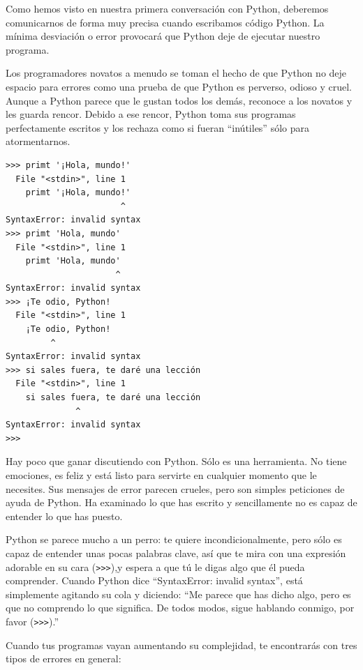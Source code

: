 Como hemos visto en nuestra primera conversación con Python, deberemos
comunicarnos de forma muy precisa cuando escribamos código Python. La mínima
desviación o error provocará que Python deje de ejecutar
nuestro programa.

Los programadores novatos a menudo se toman el hecho de que Python no
deje espacio para errores como una prueba de que Python es perverso, odioso y cruel.
Aunque a Python parece que le gustan todos los demás, reconoce a los novatos
y les guarda rencor. Debido a ese rencor,
Python toma sus programas perfectamente escritos y los rechaza como si fueran
``inútiles'' sólo para atormentarnos.

\beforeverb
\begin{verbatim}
>>> primt '¡Hola, mundo!'
  File "<stdin>", line 1
    primt '¡Hola, mundo!'
                       ^
SyntaxError: invalid syntax
>>> primt 'Hola, mundo'
  File "<stdin>", line 1
    primt 'Hola, mundo'
                      ^
SyntaxError: invalid syntax
>>> ¡Te odio, Python!
  File "<stdin>", line 1
    ¡Te odio, Python!
         ^
SyntaxError: invalid syntax
>>> si sales fuera, te daré una lección
  File "<stdin>", line 1
    si sales fuera, te daré una lección
              ^
SyntaxError: invalid syntax
>>> 
\end{verbatim}
\afterverb
%
Hay poco que ganar discutiendo con Python. Sólo es una herramienta.
No tiene emociones, es feliz y está listo para servirte en cualquier momento
que le necesites. Sus mensajes de error parecen crueles, pero son simples
peticiones de ayuda de Python. Ha examinado lo que has escrito y sencillamente
no es capaz de entender lo que has puesto.

Python se parece mucho a un perro: te quiere incondicionalmente, pero sólo es capaz
de entender unas pocas palabras clave, así que te mira con una expresión
adorable en su cara ({\tt \verb">>>"}),y espera a que tú le digas algo que él pueda comprender.
Cuando Python dice ``SyntaxError: invalid syntax'', está simplemente agitando
su cola y diciendo: ``Me parece que has dicho algo, pero es que no comprendo
lo que significa. De todos modos, sigue hablando conmigo, por favor ({\tt \verb">>>"}).''

Cuando tus programas vayan aumentando su complejidad, te encontrarás con
tres tipos de errores en general:

